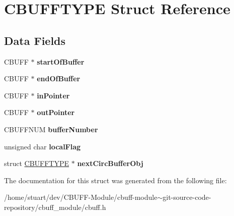 \hypertarget{struct_c_b_u_f_f_t_y_p_e}{
\section{CBUFFTYPE Struct Reference}
\label{struct_c_b_u_f_f_t_y_p_e}
}
\subsection*{Data Fields}
\begin{DoxyCompactItemize}
\item 
\hypertarget{struct_c_b_u_f_f_t_y_p_e_abaff79014652cd945a08031b491eced9}{
CBUFF $\ast$ {\bfseries startOfBuffer}}
\label{struct_c_b_u_f_f_t_y_p_e_abaff79014652cd945a08031b491eced9}

\item 
\hypertarget{struct_c_b_u_f_f_t_y_p_e_a2002a3e65c473105e6f275e55367cf54}{
CBUFF $\ast$ {\bfseries endOfBuffer}}
\label{struct_c_b_u_f_f_t_y_p_e_a2002a3e65c473105e6f275e55367cf54}

\item 
\hypertarget{struct_c_b_u_f_f_t_y_p_e_a486a5df47c656402dbe8a8ff87345580}{
CBUFF $\ast$ {\bfseries inPointer}}
\label{struct_c_b_u_f_f_t_y_p_e_a486a5df47c656402dbe8a8ff87345580}

\item 
\hypertarget{struct_c_b_u_f_f_t_y_p_e_ab32b7584a8fce8e60f609ece264af7ba}{
CBUFF $\ast$ {\bfseries outPointer}}
\label{struct_c_b_u_f_f_t_y_p_e_ab32b7584a8fce8e60f609ece264af7ba}

\item 
\hypertarget{struct_c_b_u_f_f_t_y_p_e_a987c7fc5b6352459b2ea29aa8cc5da32}{
CBUFFNUM {\bfseries bufferNumber}}
\label{struct_c_b_u_f_f_t_y_p_e_a987c7fc5b6352459b2ea29aa8cc5da32}

\item 
\hypertarget{struct_c_b_u_f_f_t_y_p_e_a1a70299bb98612c931fb930d2319f179}{
unsigned char {\bfseries localFlag}}
\label{struct_c_b_u_f_f_t_y_p_e_a1a70299bb98612c931fb930d2319f179}

\item 
\hypertarget{struct_c_b_u_f_f_t_y_p_e_a613c1f23783601cecaae7efdfee3f2d2}{
struct \hyperlink{struct_c_b_u_f_f_t_y_p_e}{CBUFFTYPE} $\ast$ {\bfseries nextCircBufferObj}}
\label{struct_c_b_u_f_f_t_y_p_e_a613c1f23783601cecaae7efdfee3f2d2}

\end{DoxyCompactItemize}


The documentation for this struct was generated from the following file:\begin{DoxyCompactItemize}
\item 
/home/stuart/dev/CBUFF-\/Module/cbuff-\/module$\sim$git-\/source-\/code-\/repository/cbuff\_\-module/cbuff.h\end{DoxyCompactItemize}
